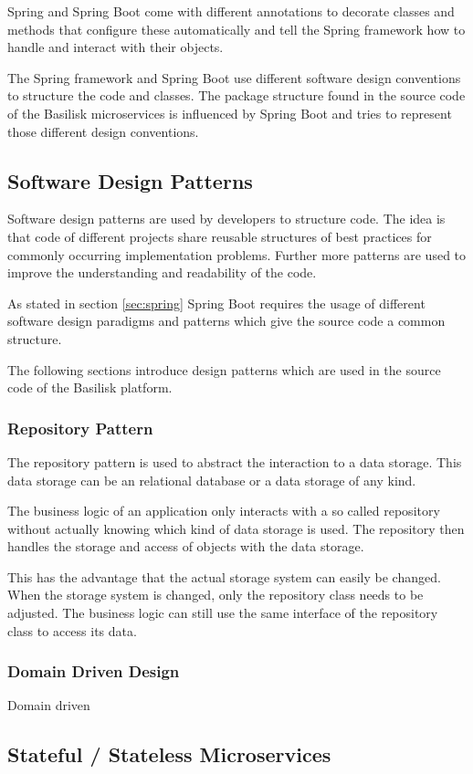 Spring and Spring Boot come with different annotations to decorate classes and methods that configure these automatically and tell the Spring framework how to handle and interact with their objects.

The Spring framework and Spring Boot use different software design conventions to structure the code and classes.
The package structure found in the source code of the Basilisk microservices is influenced by Spring Boot and tries to represent those different design conventions.


\subsection{Software Design Patterns}
\label{sec:software_design_patterns}
Software design patterns are used by developers to structure code.
The idea is that code of different projects share reusable structures of best practices for commonly occurring implementation problems.
Further more patterns are used to improve the understanding and readability of the code\cite{fowlerPatternsEnterpriseApplication2003}.

As stated in section \ref{sec:spring} Spring Boot requires the usage of different software design paradigms and patterns which give the source code a common structure.

The following sections introduce design patterns which are used in the source code of the Basilisk platform.


\subsubsection{Repository Pattern}
The repository pattern is used to abstract the interaction to a data storage.
This data storage can be an relational database or a data storage of any kind\cite{fowlerRepositoryPatternHttps, bansalDAOVsRepository2020}.

The business logic of an application only interacts with a so called repository without actually knowing which kind of data storage is used.
The repository then handles the storage and access of objects with the data storage.

This has the advantage that the actual storage system can easily be changed.
When the storage system is changed, only the repository class needs to be adjusted.
The business logic can still use the same interface of the repository class to access its data.

\subsubsection{Domain Driven Design}
Domain driven 



\subsection{Stateful / Stateless Microservices}
